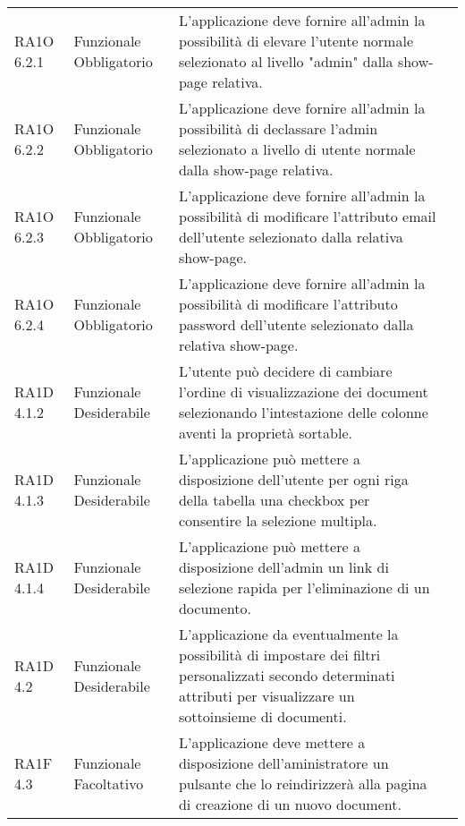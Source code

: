 \begin{center}
\begin{longtable}{ | p{2cm} | p{2cm} | p{5cm} | p{2cm} |}
 &  \\ \hline      
        RA1O 6.2.1 & Funzionale \newline  Obbligatorio  & L'applicazione deve fornire all'admin la possibilità di elevare l'utente normale selezionato al livello "admin" dalla show-page relativa. &  \\ \hline      
        RA1O 6.2.2 & Funzionale \newline  Obbligatorio  & L'applicazione deve fornire all'admin la possibilità di declassare l'admin selezionato a livello di utente normale dalla show-page relativa. &  \\ \hline      
        RA1O 6.2.3 & Funzionale \newline  Obbligatorio  & L'applicazione deve fornire all'admin la possibilità di modificare l'attributo email dell'utente selezionato dalla relativa show-page. &  \\ \hline      
        RA1O 6.2.4 & Funzionale \newline  Obbligatorio  & L'applicazione deve fornire all'admin la possibilità di modificare l'attributo password dell'utente selezionato dalla relativa show-page. &  \\ \hline      
        RA1D 4.1.2  & Funzionale \newline  Desiderabile  & L'utente può decidere di cambiare l'ordine di visualizzazione dei document selezionando l'intestazione delle colonne aventi la proprietà  sortable.
 &  \\ \hline      
        RA1D 4.1.3  & Funzionale \newline  Desiderabile  & L'applicazione può mettere a disposizione dell'utente per ogni riga della tabella una checkbox per consentire la selezione multipla.
 &  \\ \hline      
        RA1D 4.1.4  & Funzionale \newline  Desiderabile  & L'applicazione può mettere a disposizione dell'admin un link di selezione rapida per l'eliminazione di un documento.
 &  \\ \hline      
        RA1D 4.2  & Funzionale \newline  Desiderabile  & L'applicazione da  eventualmente la possibilità  di impostare dei filtri personalizzati secondo determinati attributi per visualizzare un sottoinsieme di documenti. &  \\ \hline      
        RA1F 4.3 & Funzionale \newline  Facoltativo  & L'applicazione deve mettere a disposizione dell'aministratore un pulsante che lo reindirizzerà alla pagina di creazione di un nuovo document.
 &  \\ \hline
      \end{longtable}
      \end{center}  
\clearpage

